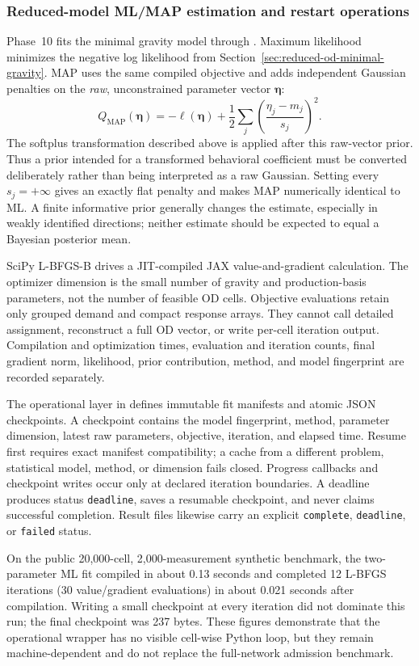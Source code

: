 \subsubsection{Reduced-model ML/MAP estimation and restart operations}
\label{sec:reduced-od-estimator}

Phase~10 fits the minimal gravity model through
.  Maximum
likelihood minimizes the negative log likelihood from
Section~\ref{sec:reduced-od-minimal-gravity}.  MAP uses the same compiled
objective and adds independent Gaussian penalties on the \emph{raw},
unconstrained parameter vector $\bm\eta$:
\[
  Q_{\mathrm{MAP}}(\bm\eta)
  =-\ell(\bm\eta)
   +\frac12\sum_j
    \left(\frac{\eta_j-m_j}{s_j}\right)^2.
\]
The softplus transformation described above is applied after this raw-vector
prior.  Thus a prior intended for a transformed behavioral coefficient must be
converted deliberately rather than being interpreted as a raw Gaussian.
Setting every $s_j=+\infty$ gives an exactly flat penalty and makes MAP
numerically identical to ML.  A finite informative prior generally changes the
estimate, especially in weakly identified directions; neither estimate should
be expected to equal a Bayesian posterior mean.

SciPy L-BFGS-B drives a JIT-compiled JAX value-and-gradient calculation.  The
optimizer dimension is the small number of gravity and production-basis
parameters, not the number of feasible OD cells.  Objective evaluations retain
only grouped demand and compact response arrays.  They cannot call detailed
assignment, reconstruct a full OD vector, or write per-cell iteration output.
Compilation and optimization times, evaluation and iteration counts, final
gradient norm, likelihood, prior contribution, method, and model fingerprint
are recorded separately.

The operational layer in  defines immutable fit manifests
and atomic JSON checkpoints.  A checkpoint contains the model fingerprint,
method, parameter dimension, latest raw parameters, objective, iteration, and
elapsed time.  Resume first requires exact manifest compatibility; a cache from
a different problem, statistical model, method, or dimension fails closed.
Progress callbacks and checkpoint writes occur only at declared iteration
boundaries.  A deadline produces status \texttt{deadline}, saves a resumable
checkpoint, and never claims successful completion.  Result files likewise
carry an explicit \texttt{complete}, \texttt{deadline}, or \texttt{failed}
status.

On the public 20,000-cell, 2,000-measurement synthetic benchmark, the
two-parameter ML fit compiled in about 0.13 seconds and completed 12 L-BFGS
iterations (30 value/gradient evaluations) in about 0.021 seconds after
compilation.  Writing a small checkpoint at every iteration did not dominate
this run; the final checkpoint was 237 bytes.  These figures demonstrate that
the operational wrapper has no visible cell-wise Python loop, but they remain
machine-dependent and do not replace the full-network admission benchmark.

